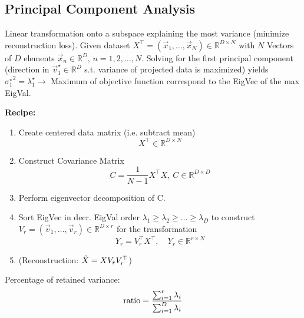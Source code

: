 \subsection{Principal Component Analysis}
    Linear transformation onto a subspace explaining the most variance (minimize reconstruction loss). Given dataset $X^\top = (\Vec{x}_1,\dots,\Vec{x}_N)\in\mathbb{R}^{D\times N}$ with $N$ Vectors of $D$ elements $\Vec{x}_n\in\mathbb{R}^D,\, n = 1,2,\dots,N$. %
    Solving for the first principal component (direction in $\Vec{v}_1^\star\in\mathbb{R}^D$ s.t. variance of projected data is maximized) yields ${\sigma_1^\star}^2 = \lambda_1^\star \rightarrow$ Maximum of objective function correspond to the EigVec of the max EigVal.
    
    \textbf{Recipe:}
    \begin{enumerate}
        \item Create centered data matrix (i.e. subtract mean)
            \begin{equation*}
                X^\top\in\mathbb{R}^{D\times N}
            \end{equation*}
            
        \item Construct Covariance Matrix 
            \begin{equation*}
                C = \frac{1}{N-1}X^\top X,\ C\in\mathbb{R}^{D\times D}
            \end{equation*}
        
        \item Perform eigenvector decomposition of C.
        \item Sort EigVec in decr. EigVal order $\lambda_1\geq\lambda_2\geq\dots\geq\lambda_D$ to construct $V_r = (\Vec{v}_1,\dots,\Vec{v}_r)\in\mathbb{R}^{D\times r}$ for the transformation 
        \begin{equation*}
        Y_r = V_r^\top X^\top, \quad Y_r \in\mathbb{R}^{r\times N}
        \end{equation*}
        
        \item \Big(Reconstruction: $\Tilde{X} = X V_r V_r^\top$\Big)
        
    \end{enumerate}
    
    Percentage of retained variance:
    \begin{equation*}
        \textnormal{ratio} = \frac{\sum_{i=1}^r \lambda_i}{\sum_{i=1}^D \lambda_i}
    \end{equation*}